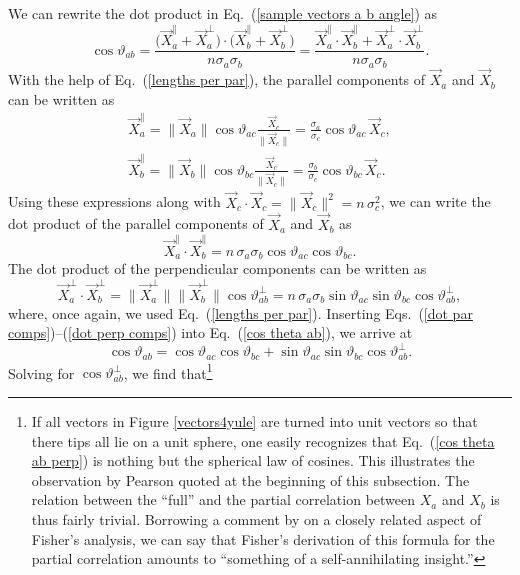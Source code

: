 We can rewrite the dot product in Eq.\ (\ref{sample vectors a b angle}) as
\begin{equation}
\cos{\vartheta_{ab}} = \frac{\big( \vec{X}_a^\parallel + \vec{X}_a^\perp \big) \! \cdot \! \big(  \vec{X}_b^\parallel + \vec{X}_b^\perp \big)}{n \sigma_a \sigma_b}
= \frac{\vec{X}_a^\parallel \! \cdot \! \vec{X}_b^\parallel + \vec{X}_a^\perp \! \cdot \! \vec{X}_b^\perp}{n \sigma_a \sigma_b}.
\label{cos theta ab}
\end{equation}
With the help of Eq.\ (\ref{lengths per par}), the parallel components of $\vec{X}_a$ and $\vec{X}_b$ can be written as
\begin{equation}
\begin{array}{c}
\vec{X}_a^\parallel = \| \vec{X}_a \| \cos{\vartheta_{ac}} \displaystyle{\frac{\vec{X}_c}{\| \vec{X}_c \|}} = \displaystyle{\frac{\sigma_a}{\sigma_c}} \cos{\vartheta_{ac}} \, \vec{X}_c, 
\\[.5cm]
\vec{X}_b^\parallel = \| \vec{X}_b \| \cos{\vartheta_{bc}} \displaystyle{\frac{\vec{X}_c}{\| \vec{X}_c \|}} = \displaystyle{\frac{\sigma_b}{\sigma_c}} \cos{\vartheta_{bc}} \, \vec{X}_c.
\end{array}
\label{ab par vecs and vec c} 
\end{equation}
Using these expressions along with $\vec{X}_c \! \cdot \! \vec{X}_c = \| \vec{X}_c \|^2 = n \, \sigma_c^2$, we can write the dot product of the parallel components of $\vec{X}_a$ and $\vec{X}_b$ as
\begin{equation}
\vec{X}_a^\parallel \! \cdot \! \vec{X}_b^\parallel = n \, \sigma_a \sigma_b \cos{\vartheta_{ac}} \cos{\vartheta_{bc}}.
\label{dot par comps}
\end{equation}
The dot product of the perpendicular components can be written as
\begin{equation}
\vec{X}_a^\perp \! \cdot \! \vec{X}_b^\perp = \| \vec{X}_a^\perp \| \| \vec{X}_b^\perp \|   \cos{\vartheta_{ab}^\perp} =
n \, \sigma_a \sigma_b \sin{\vartheta_{ac}} \sin{\vartheta_{bc}} \cos{\vartheta_{ab}^\perp},
\label{dot perp comps}
\end{equation}
where, once again, we used Eq.\ (\ref{lengths per par}). Inserting Eqs.\ (\ref{dot par comps})--(\ref{dot perp comps}) into Eq.\ (\ref{cos theta ab}), we arrive at
\begin{equation}
\cos{\vartheta_{ab}} = \cos{\vartheta_{ac}} \cos{\vartheta_{bc}} + \sin{\vartheta_{ac}} \sin{\vartheta_{bc}} \cos{\vartheta_{ab}^\perp}.
\label{cos theta ab 2}
\end{equation}
Solving for $\cos{\vartheta_{ab}^\perp}$, we find that\footnote{If all vectors in Figure \ref{vectors4yule} are turned into unit vectors so that there tips all lie on a unit sphere, one easily recognizes that Eq.\ (\ref{cos theta ab perp}) is nothing but the spherical law of cosines. This illustrates the observation by Pearson quoted at the beginning of this subsection. The relation between the ``full'' and the partial correlation between $X_a$ and $X_b$ is thus fairly trivial. Borrowing a comment by \citet[p.\ 73]{Aldrich 1998} on a closely related aspect of Fisher's analysis, we can say that Fisher's derivation of this formula for the partial correlation amounts to ``something of a self-annihilating insight.''}
